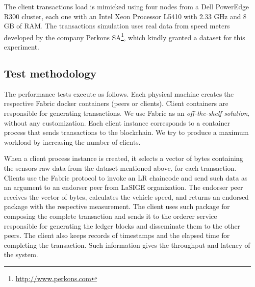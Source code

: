 \documentclass[journal]{IEEEtran}
\begin{document}
The client transactions load is mimicked using four nodes from a Dell PowerEdge R300 cluster, each one with an Intel Xeon Processor L5410 with 2.33 GHz and 8 GB of RAM.
The transactions simulation uses real data from speed meters developed by the company Perkons SA\footnote{\url{http://www.perkons.com}}, which kindly granted a dataset for this experiment.

\subsection{Test methodology}
The performance tests execute as follows.
Each physical machine creates the respective Fabric docker containers (peers or clients).
Client containers are responsible for generating transactions.
We use Fabric as an \emph{off-the-shelf solution}, without any customization.
Each client instance corresponds to a container process that sends transactions to the blockchain.
We try to produce a maximum workload by increasing the number of clients.


When a client process instance is created, it selects a vector of bytes containing the sensors raw data from the dataset mentioned above, for each transaction.
Clients use the Fabric protocol to invoke an LR chaincode and send such data as an argument to an endorser peer from LaSIGE organization.
The endorser peer receives the vector of bytes, calculates the vehicle speed, and returns an endorsed package with the respective measurement.
The client uses such package for composing the complete transaction and sends it to the orderer service responsible for generating the ledger blocks and disseminate them to the other peers.
The client also keeps records of timestamps and the elapsed time for completing the transaction.
Such information gives the throughput and latency of the system. %
\end{document}

